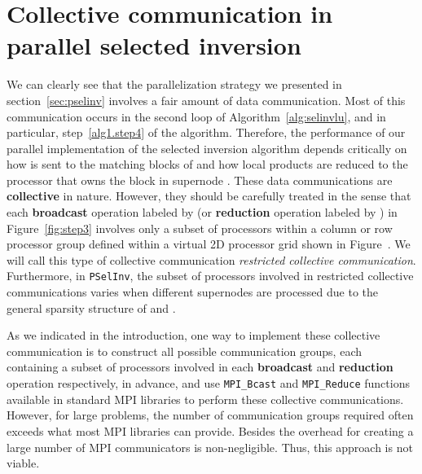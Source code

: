 \documentclass{acm_proc_article-sp}
\newcommand{\pselinv}{\texttt{PSelInv}\xspace}
\begin{document}
\section{Collective communication in \newline parallel selected inversion}\label{sec:comm}



We can clearly see that the parallelization strategy we presented
in section~\ref{sec:pselinv} involves a fair amount of data communication.
Most of this communication occurs in the second loop of 
Algorithm~\ref{alg:selinvlu}, and in particular, step~\ref{alg1.step4} of 
the algorithm.
Therefore, the performance of our parallel implementation of the 
selected inversion algorithm depends critically on how
 is sent to the matching blocks of  
and how local products  are reduced 
to the processor that owns the  block in supernode .
These data communications are \textbf{collective} in nature.  
However, they should be carefully treated in the sense that each \textbf{broadcast} 
operation labeled by  
(or \textbf{reduction} operation labeled by ) in
Figure~\ref{fig:step3} involves only a subset of processors 
within a column or row processor group defined within a 
virtual 2D processor grid shown in Figure~.
We will call this type of collective communication {\em restricted
collective communication}. Furthermore, in \pselinv, the subset of 
processors involved in restricted collective communications
varies when different supernodes are processed
due to the general sparsity structure of  and .

As we indicated in the introduction, one way to implement
these collective communication is to construct all possible 
communication groups, each containing a subset of processors
involved in each \textbf{broadcast} and \textbf{reduction}
operation respectively, in advance, and use \texttt{MPI\_Bcast} 
and \texttt{MPI\_Reduce} functions available in standard MPI 
libraries to perform these collective communications. However, 
for large problems, the number of communication groups required 
often exceeds what most MPI libraries can provide. Besides the overhead
for creating a large number of MPI communicators is non-negligible.
Thus, this approach is not viable.
\end{document}
